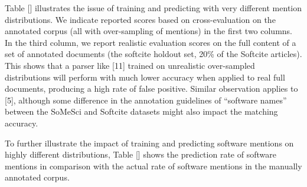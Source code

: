 \documentclass[
]{article}
\begin{document}
Table {[}{]} illustrates the issue of training and predicting with very
different mention distributions. We indicate reported scores based on
cross-evaluation on the annotated corpus (all with over-sampling of
mentions) in the first two columns. In the third column, we report
realistic evaluation scores on the full content of a set of annotated
documents (the softcite holdout set, 20\% of the Softcite articles).
This shows that a parser like {[}11{]} trained on unrealistic
over-sampled distributions will perform with much lower accuracy when
applied to real full documents, producing a high rate of false positive.
Similar observation applies to {[}5{]}, although some difference in the
annotation guidelines of ``software names'' between the SoMeSci and
Softcite datasets might also impact the matching accuracy.

To further illustrate the impact of training and predicting software
mentions on highly different distributions, Table {[}{]} shows the
prediction rate of software mentions in comparison with the actual rate
of software mentions in the manually annotated corpus.
\end{document}
